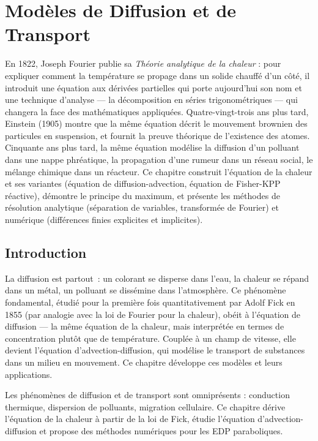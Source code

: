 \chapter{Mod\`eles de Diffusion et de Transport}
\label{ch:diffusion}

En 1822, Joseph Fourier publie sa \emph{Théorie analytique de la chaleur} : pour expliquer comment la température se propage dans un solide chauffé d'un côté, il introduit une équation aux dérivées partielles qui porte aujourd'hui son nom et une technique d'analyse --- la décomposition en séries trigonométriques --- qui changera la face des mathématiques appliquées. Quatre-vingt-trois ans plus tard, Einstein (1905) montre que la même équation décrit le mouvement brownien des particules en suspension, et fournit la preuve théorique de l'existence des atomes. Cinquante ans plus tard, la même équation modélise la diffusion d'un polluant dans une nappe phréatique, la propagation d'une rumeur dans un réseau social, le mélange chimique dans un réacteur. Ce chapitre construit l'équation de la chaleur et ses variantes (équation de diffusion-advection, équation de Fisher-KPP réactive), démontre le principe du maximum, et présente les méthodes de résolution analytique (séparation de variables, transformée de Fourier) et numérique (différences finies explicites et implicites).

\section{Introduction}

La diffusion est partout~: un colorant se disperse dans l'eau, la chaleur se r\'epand dans un m\'etal, un polluant se diss\'emine dans l'atmosph\`ere. Ce ph\'enom\`ene fondamental, \'etudi\'e pour la premi\`ere fois quantitativement par Adolf Fick en 1855 (par analogie avec la loi de Fourier pour la chaleur), ob\'eit \`a l'\'equation de diffusion --- la m\^eme \'equation de la chaleur, mais interpr\'et\'ee en termes de concentration plut\^ot que de temp\'erature. Coupl\'ee \`a un champ de vitesse, elle devient l'\'equation d'advection-diffusion, qui mod\'elise le transport de substances dans un milieu en mouvement. Ce chapitre d\'eveloppe ces mod\`eles et leurs applications.

Les ph\'enom\`enes de diffusion et de transport sont omnipr\'esents :
conduction thermique, dispersion de polluants, migration cellulaire.
Ce chapitre d\'erive l'\'equation de la chaleur \`a partir de la loi
de Fick, \'etudie l'\'equation d'advection-diffusion et propose des
m\'ethodes num\'eriques pour les EDP paraboliques.

